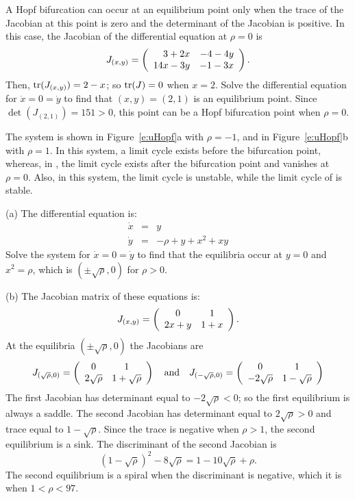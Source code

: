 \soln A Hopf bifurcation can occur at an equilibrium point only when the 
trace of the Jacobian at this point is zero and the determinant of the 
Jacobian is positive.  In this case, the Jacobian of the differential 
equation at $\rho = 0$ is
\[
J_{(x,y)} = \left(\begin{array}{rr} 3 + 2x & -4 - 4y\\ 14x - 3y &-1 - 3x\end{array}\right).
\]
Then, ${\rm tr}(J_{(x,y)}) = 2 - x$; so ${\rm tr}(J) = 0$ when $x = 2$.  Solve
the differential equation for $\dot{x} = 0 = \dot{y}$ to find that $(x,y) =
(2,1)$ is an equilibrium point.  Since $\det(J_{(2,1)}) = 151 > 0$, this 
point can be a Hopf bifurcation point when $\rho = 0$.

The system is shown in Figure~\ref{e:uHopf}a with $\rho = -1$, and in
Figure~\ref{e:uHopf}b with $\rho = 1$.  In this system, a limit cycle
exists before the bifurcation point, whereas, in , the
limit cycle exists after the bifurcation point and vanishes at
$\rho = 0$.  Also, in this system, the limit cycle is unstable, while
the limit cycle of  is stable.

\begin{figure}[htb]
                       \centerline{%
                       }
\end{figure}

 \soln
(a) The differential equation  is:
\[
\begin{array}{rcl}
\dot{x} & = &  y \\
\dot{y} & = &  -\rho + y + x^2 + xy
\end{array}
\]
Solve the system for $\dot{x} = 0 = \dot{y}$ to find that the equilibria
occur at $y = 0$ and $x^2 = \rho$, which is $(\pm\sqrt{\rho},0)$
for $\rho > 0$.

(b)  The Jacobian matrix of these equations is:
\[
J_{(x,y)} = \left(\begin{array}{cc} 0 & 1\\ 2x+y &1+x\end{array}\right).
\]
At the equilibria $(\pm\sqrt{\rho},0)$ the Jacobians are
\[
J_{(\sqrt{\rho},0)}= \left(\begin{array}{cc} 0 & 1\\ 2\sqrt{\rho} &1+\sqrt{\rho}\end{array}\right) 
\quad\mbox{and}\quad
J_{(-\sqrt{\rho},0)}= \left(\begin{array}{cc} 0 & 1\\ -2\sqrt{\rho} &1-\sqrt{\rho}\end{array}\right)
\]
The first Jacobian has determinant equal to $-2\sqrt{\rho}<0$; so the
first equilibrium is always a saddle.  The second Jacobian has determinant
equal to $2\sqrt{\rho}>0$ and trace equal to $1-\sqrt{\rho}$.  Since the
trace is negative when $\rho>1$, the second equilibrium is a sink.  The
discriminant of the second Jacobian is 
\[
(1-\sqrt{\rho})^2-8\sqrt{\rho}=1-10\sqrt{\rho}+\rho.
\]
The second equilibrium is a spiral when the discriminant is negative, which
it is when $1<\rho<97$.

